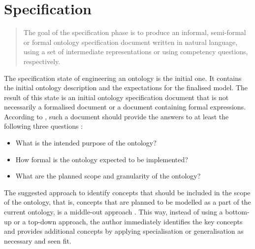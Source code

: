 \chapter{Specification}\label{ch:Specification}


\blockquote[{{\cite[p. 2]{fernandez-lopez1997METHONTOLOGYOntologicalArt}}}]{The goal of the specification phase is to produce an informal, semi-formal or formal ontology specification document written in natural language, using a set of intermediate representations or using competency questions, respectively.}

The specification state of engineering an ontology is the initial one. It contains the initial ontology description and the expectations for the finalised model. The result of this state is an initial ontology specification document that is not necessarily a formalised document or a document containing formal expressions. According to \citeauthor{fernandez-lopez1997METHONTOLOGYOntologicalArt}, such a document should provide the answers to at least the following three questions
\cite{fernandez-lopez1997METHONTOLOGYOntologicalArt}%
:

\begin{itemize}
    \item What is the intended purpose of the ontology?
    \item How formal is the ontology expected to be implemented?
    \item What are the planned scope and granularity of the ontology?
\end{itemize}

The suggested approach to identify concepts that should be included in the scope of the ontology, that is, concepts that are planned to be modelled as a part of the current ontology, is a middle-out approach \cite{fernandez-lopez1997METHONTOLOGYOntologicalArt,uschold1996OntologiesPrinciplesMethods}. This way, instead of using a bottom-up or a top-down approach, the author immediately identifies the key concepts and provides additional concepts by applying specialisation or generalisation as necessary and seen fit.

